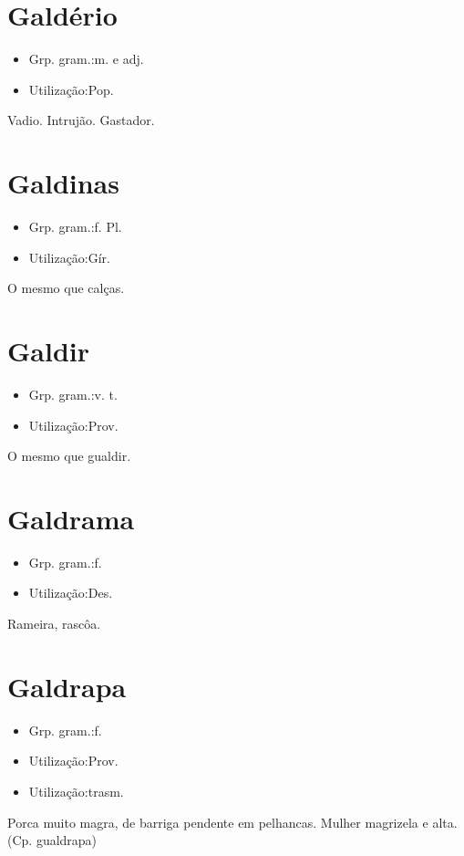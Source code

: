 \section{Galdério}
\begin{itemize}
\item {Grp. gram.:m.  e  adj.}
\end{itemize}
\begin{itemize}
\item {Utilização:Pop.}
\end{itemize}
Vadio.
Intrujão.
Gastador.
\section{Galdinas}
\begin{itemize}
\item {Grp. gram.:f. Pl.}
\end{itemize}
\begin{itemize}
\item {Utilização:Gír.}
\end{itemize}
O mesmo que \textunderscore calças\textunderscore .
\section{Galdir}
\begin{itemize}
\item {Grp. gram.:v. t.}
\end{itemize}
\begin{itemize}
\item {Utilização:Prov.}
\end{itemize}
O mesmo que \textunderscore gualdir\textunderscore .
\section{Galdrama}
\begin{itemize}
\item {Grp. gram.:f.}
\end{itemize}
\begin{itemize}
\item {Utilização:Des.}
\end{itemize}
Rameira, rascôa.
\section{Galdrapa}
\begin{itemize}
\item {Grp. gram.:f.}
\end{itemize}
\begin{itemize}
\item {Utilização:Prov.}
\end{itemize}
\begin{itemize}
\item {Utilização:trasm.}
\end{itemize}
Porca muito magra, de barriga pendente em pelhancas.
Mulher magrizela e alta.
(Cp. \textunderscore gualdrapa\textunderscore )
